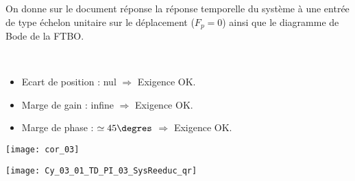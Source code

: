 On donne sur le document réponse la réponse temporelle du système à une entrée de type échelon unitaire sur le déplacement ($F_p=0$) ainsi que le diagramme de Bode de la FTBO.

\ifprof
\begin{corrige}~\\
\begin{itemize}
\item Ecart de position : nul $\Rightarrow$ Exigence OK.
\item Marge de gain : infine $\Rightarrow$ Exigence OK.
\item Marge de phase : $\simeq 45\degres$ $\Rightarrow$ Exigence OK.
\end{itemize}

\begin{center}
\texttt{[image: cor\_03]}
\end{center}
 
\end{corrige}
\else
\fi



\ifprof
\else
\begin{marginfigure}
\centering
\texttt{[image: Cy\_03\_01\_TD\_PI\_03\_SysReeduc\_qr]}
\end{marginfigure}
\fi



%
%
%
%
%
%
%
%
%
%
%
